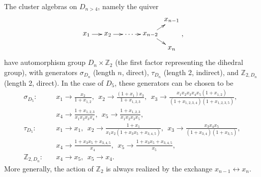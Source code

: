 \documentclass[11pt]{article}
\begin{document}
The cluster algebras on $D_{n>4}$, namely the quiver
\begin{equation}
    \begin{gathered}
    \begin{xy} 0;<1pt,0pt>:<0pt,-1pt>::
      (0,20) *+{x_1} ="1",
      (30,20) *+{x_2} ="2",
      (60,20) *+{\ldots} ="3",
      (90,20) *+{x_{n-2}} ="4",
      (120,0) *+{x_{n-1}} ="5",
      (120,40) *+{x_{n}} ="6",
      "1", {\ar"2"},
      "2", {\ar"3"},
      "3", {\ar"4"},
      "4", {\ar"5"},
      "4", {\ar"6"},
    \end{xy}
    \end{gathered},
\end{equation}
have automorphism group $D_n \times \mathbb{Z}_2$ (the first factor representing the dihedral group), with generators $\sigma_{D_n}$ (length $n$, direct), $\tau_{D_n}$ (length 2, indirect), and $\mathbb{Z}_{2,D_n}$ (length 2, direct). In the case of $D_5$, these generators can be chosen to be
\vspace{.1cm}
\begin{equation}
\begin{split}
  \sigma_{D_5}:\quad& 
    x_1\to \frac{x_2}{1+x_{1,2}},~~
    x_2\to \frac{(1+x_1) x_3}{1+x_{1,2,3}},~~
    x_3\to \frac{x_1 x_2 x_3 x_4 x_5 (1+x_{1,2})}{(1+x_{1,2,3,4}) (1+x_{1,2,3,5})},\\&
    x_4\to \frac{1+x_{1,2,3}}{x_1 x_2 x_3 x_4},~~
    x_5\to \frac{1+x_{1,2,3}}{x_1 x_2 x_3 x_5},\\[2ex]
  \tau_{D_5}:\quad& 
    x_1\to x_1,~~
    x_2\to \frac{1+x_1}{x_1 x_2 (1+x_3 x_5+x_{3,4,5})},~~
    x_3\to \frac{x_3 x_4 x_5}{(1+x_{3,4}) (1+x_{3,5})},\\&
    x_4\to \frac{1+x_3 x_5+x_{3,4,5}}{x_4},~~
    x_5\to \frac{1+x_3 x_5+x_{3,4,5}}{x_5}, \\[2ex]
    \mathbb{Z}_{2,D_n}:\quad& x_4 \to x_5,~~ x_5 \to x_4.
\end{split}  
\end{equation}
More generally, the action of $\mathbb{Z}_2$ is always realized by the exchange $x_{n-1} \leftrightarrow x_n$. 
\end{document}
